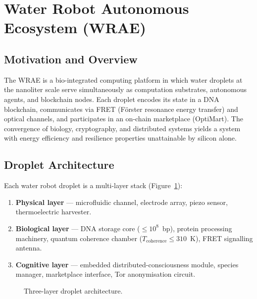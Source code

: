 \documentclass[12pt,a4paper]{article}
\begin{document}
\section{Water Robot Autonomous Ecosystem (WRAE)}
\label{sec:wrae}

\subsection{Motivation and Overview}

The WRAE is a bio-integrated computing platform in which water droplets at the
nanoliter scale serve simultaneously as computation substrates, autonomous
agents, and blockchain nodes.  Each droplet encodes its state in a DNA
blockchain, communicates via FRET (Förster resonance energy transfer) and
optical channels, and participates in an on-chain marketplace (OptiMart).
The convergence of biology, cryptography, and distributed systems yields a
system with energy efficiency and resilience properties unattainable by
silicon alone.

\subsection{Droplet Architecture}

Each water robot droplet is a multi-layer stack
(Figure~\ref{fig:droplet-arch}):
\begin{enumerate}
\item \textbf{Physical layer} — microfluidic channel, electrode array, piezo sensor,
      thermoelectric harvester.
\item \textbf{Biological layer} — DNA storage core ($\leq 10^8$~bp),
      protein processing machinery, quantum coherence chamber
      ($T_\mathrm{coherence} \leq 310$~K), FRET signalling antenna.
\item \textbf{Cognitive layer} — embedded distributed-consciousness module,
      species manager, marketplace interface, Tor anonymisation circuit.
\end{enumerate}

\begin{figure}[ht]
\centering
{}
\caption{Three-layer droplet architecture.}
\label{fig:droplet-arch}
\end{figure}
\end{document}

